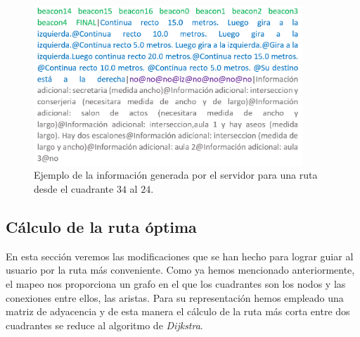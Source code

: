 \begin{figure}[t]
	\centering
	\includegraphics[width=0.9\textwidth]{Imagenes/Capitulo4/ejemploRuta}
	\caption{Ejemplo de la información generada por el servidor para una ruta desde el cuadrante $34$ al $24$.}
	\label{fig:ejemplo_ruta}
\end{figure}


\subsection{Cálculo de la ruta óptima}
\label{sub:rutaOptima}

En esta sección veremos las modificaciones que se han hecho para lograr guiar al usuario por la ruta más conveniente. Como ya hemos mencionado anteriormente, el mapeo nos proporciona un grafo en el que los cuadrantes son los nodos y las conexiones entre ellos, las aristas. Para su representación hemos empleado una matriz de adyacencia y de esta manera el cálculo de la ruta más corta entre dos cuadrantes se reduce al algoritmo de \textit{Dijkstra}.

